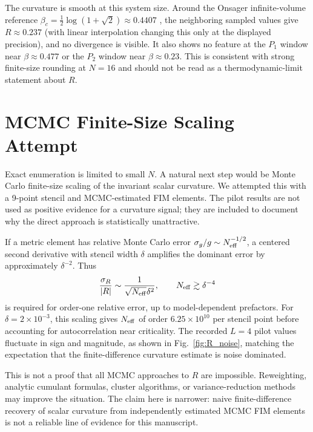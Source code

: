 \documentclass[11pt,a4paper]{article}
\begin{document}
The curvature is smooth at this system size.  Around the Onsager infinite-volume reference $\beta_c=\frac12\log(1+\sqrt2)\approx0.4407$ \citep{onsager1944crystal}, the neighboring sampled values give $R\approx0.237$ (with linear interpolation changing this only at the displayed precision), and no divergence is visible.  It also shows no feature at the $P_1$ window near $\beta\approx0.477$ or the $P_2$ window near $\beta\approx0.23$.  This is consistent with strong finite-size rounding at $N=16$ and should not be read as a thermodynamic-limit statement about $R$.

\section{MCMC Finite-Size Scaling Attempt}
\label{sec:mcmc}

Exact enumeration is limited to small $N$.  A natural next step would be Monte Carlo finite-size scaling of the invariant scalar curvature.  We attempted this with a 9-point stencil and MCMC-estimated FIM elements.  The pilot results are not used as positive evidence for a curvature signal; they are included to document why the direct approach is statistically unattractive.

If a metric element has relative Monte Carlo error $\sigma_g/g\sim N_{\rm eff}^{-1/2}$, a centered second derivative with stencil width $\delta$ amplifies the dominant error by approximately $\delta^{-2}$.  Thus
\begin{equation}
\frac{\sigma_R}{|R|}
\sim \frac{1}{\sqrt{N_{\rm eff}}\delta^2},
\qquad
N_{\rm eff}\gtrsim \delta^{-4}
\end{equation}
is required for order-one relative error, up to model-dependent prefactors.  For $\delta=2\times10^{-3}$, this scaling gives $N_{\rm eff}$ of order $6.25\times10^{10}$ per stencil point before accounting for autocorrelation near criticality.  The recorded $L=4$ pilot values fluctuate in sign and magnitude, as shown in Fig.~\ref{fig:R_noise}, matching the expectation that the finite-difference curvature estimate is noise dominated.

This is not a proof that all MCMC approaches to $R$ are impossible.  Reweighting, analytic cumulant formulas, cluster algorithms, or variance-reduction methods may improve the situation.  The claim here is narrower: naive finite-difference recovery of scalar curvature from independently estimated MCMC FIM elements is not a reliable line of evidence for this manuscript.
\end{document}
